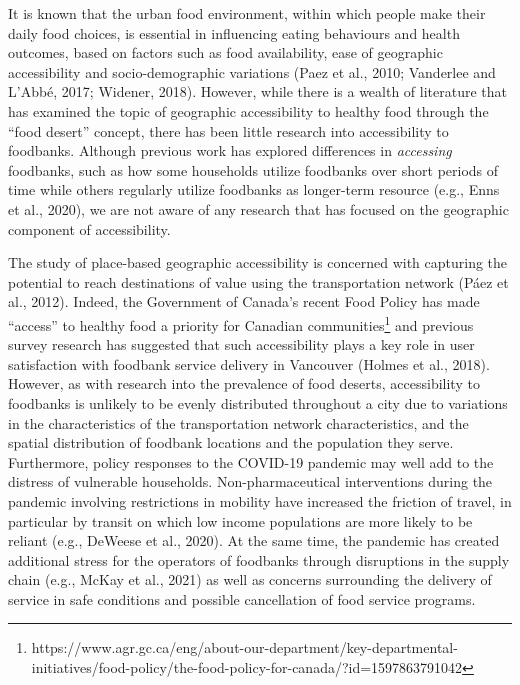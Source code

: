 \documentclass[]{elsarticle} %
\begin{document}
It is known that the urban food environment, within which people make
their daily food choices, is essential in influencing eating behaviours
and health outcomes, based on factors such as food availability, ease of
geographic accessibility and socio-demographic variations (Paez et al.,
2010; Vanderlee and L'Abbé, 2017; Widener, 2018). However, while there
is a wealth of literature that has examined the topic of geographic
accessibility to healthy food through the ``food desert'' concept, there
has been little research into accessibility to foodbanks. Although
previous work has explored differences in \emph{accessing} foodbanks,
such as how some households utilize foodbanks over short periods of time
while others regularly utilize foodbanks as longer-term resource (e.g.,
Enns et al., 2020), we are not aware of any research that has focused on
the geographic component of accessibility.

The study of place-based geographic accessibility is concerned with
capturing the potential to reach destinations of value using the
transportation network (Páez et al., 2012). Indeed, the Government of
Canada's recent Food Policy has made ``access'' to healthy food a
priority for Canadian communities\footnote{https://www.agr.gc.ca/eng/about-our-department/key-departmental-initiatives/food-policy/the-food-policy-for-canada/?id=1597863791042}
and previous survey research has suggested that such accessibility plays
a key role in user satisfaction with foodbank service delivery in
Vancouver (Holmes et al., 2018). However, as with research into the
prevalence of food deserts, accessibility to foodbanks is unlikely to be
evenly distributed throughout a city due to variations in the
characteristics of the transportation network characteristics, and the
spatial distribution of foodbank locations and the population they
serve. Furthermore, policy responses to the COVID-19 pandemic may well
add to the distress of vulnerable households. Non-pharmaceutical
interventions during the pandemic involving restrictions in mobility
have increased the friction of travel, in particular by transit on which
low income populations are more likely to be reliant (e.g., DeWeese et
al., 2020). At the same time, the pandemic has created additional stress
for the operators of foodbanks through disruptions in the supply chain
(e.g., McKay et al., 2021) as well as concerns surrounding the delivery
of service in safe conditions and possible cancellation of food service
programs.
\end{document}
